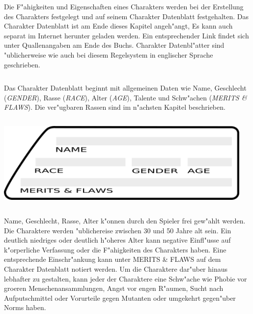 Die F"ahigkeiten und Eigenschaften eines Charakters werden bei der Erstellung des Charakters festgelegt und auf seinem Charakter Datenblatt festgehalten. Das Charakter Datenblatt ist am Ende dieses Kapitel angeh"angt, Es kann auch separat im Internet herunter geladen werden. Ein entsprechender Link findet sich unter Quallenangaben am Ende des Buchs. Charakter Datenbl"atter sind "ublicherweise wie auch bei diesem Regelsystem in englischer Sprache geschrieben.


\begin{column}[l]{0.48}
    Das Charakter Datenblatt beginnt mit allgemeinen Daten wie Name, Geschlecht (\emph{GENDER}), Rasse (\emph{RACE}), Alter (\emph{AGE}), Talente und Schw"achen (\emph{MERITS \& FLAWS}). Die ver"ugbaren Rassen sind im n"achsten Kapitel beschrieben.
\end{column}
\begin{column}[r]{0.52}
    \centering
    \includegraphics[width=0.95\textwidth]{images/character_base_stats.png}
    \medskip   
\end{column}
\medskip

Name, Geschlecht, Rasse, Alter k"onnen durch den Spieler frei gew"ahlt werden. Die Charaktere werden "ublichereise zwischen 30 und 50 Jahre alt sein. Ein deutlich niedriges oder deutlich h"oheres Alter kann negative Einfl"usse auf k"orperliche Verfassung oder die F"ahigkeiten des Charakters haben. Eine entsprechende Einschr"ankung kann unter MERITS \& FLAWS auf dem Charakter Datenblatt notiert werden. Um die Charaktere dar"uber hinaus lebhafter zu gestalten, kann jeder der Charaktere eine Schw"ache wie Phobie vor gro\3eren Menschenansammlungen, Angst vor engen R"aumen, Sucht nach Aufputschmittel oder Vorurteile gegen Mutanten oder umgekehrt gegen"uber Norms haben.

